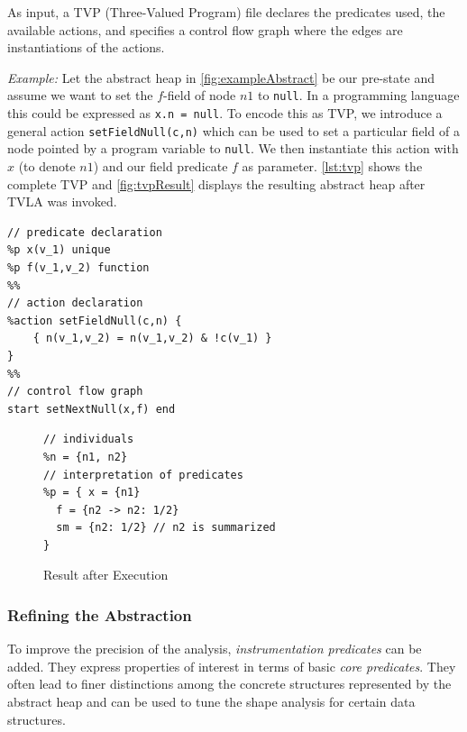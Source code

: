 \documentclass[11pt,a4paper,english]{article}
\begin{document}
As input, a TVP (Three-Valued Program) file declares the
predicates used, the available actions, and specifies a control flow graph where
the edges are instantiations of the actions.

\textit{Example: } Let the abstract heap in \autoref{fig:exampleAbstract} be our
pre-state and assume we  want to set the $f$-field of node $n1$ to
\texttt{null}. In a programming language this could be expressed as \texttt{x.n
= null}. To encode this as TVP, we introduce a general action
\texttt{setFieldNull(c,n)} which can be used to set a particular field of a node
pointed by a program variable to \texttt{null}. We then instantiate this action
with $x$ (to denote $n1$) and our field predicate $f$ as parameter.
\autoref{lst:tvp} shows the complete TVP and \autoref{fig:tvpResult} displays
the resulting abstract heap after TVLA was invoked.

\begin{lstlisting}[language=tvp,caption={TVP for Example},label=lst:tvp]
// predicate declaration
%p x(v_1) unique
%p f(v_1,v_2) function
%%
// action declaration
%action setFieldNull(c,n) {
	{ n(v_1,v_2) = n(v_1,v_2) & !c(v_1) }
}
%%
// control flow graph
start setNextNull(x,f) end
\end{lstlisting}

\begin{figure}[h]
\begin{lrbox}{\mylistingbox}
\begin{minipage}[b]{.45\linewidth}
\begin{lstlisting}[boxpos=b,language=tvs]
// individuals
%n = {n1, n2} 
// interpretation of predicates
%p = { x = {n1}
  f = {n2 -> n2: 1/2}
  sm = {n2: 1/2} // n2 is summarized
}
\end{lstlisting}
\end{minipage}
  \end{lrbox}
  \hspace{1cm}
  \caption{Result after Execution}
  \label{fig:tvpResult}
\end{figure}

  
\subsubsection{Refining the Abstraction}  
To improve the precision of the analysis, \textit{instrumentation predicates}
can be added. They express properties of interest in terms of basic \textit{core
predicates}. They often lead to finer distinctions among the concrete structures
represented by the abstract heap and can be used to tune the shape analysis for
certain data structures.
\end{document}
